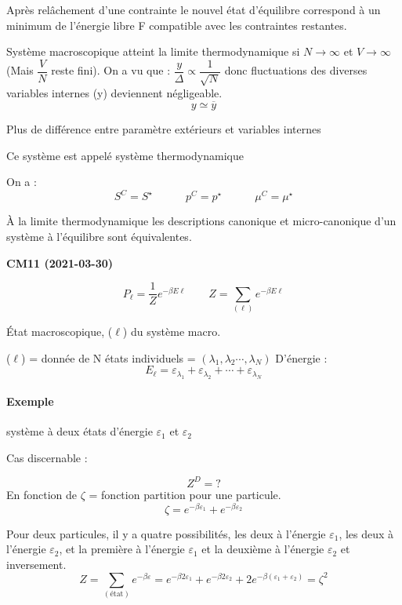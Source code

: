 \documentclass[12pt,a4paper]{report}
\begin{document}
Après relâchement d'une contrainte le nouvel état d'équilibre correspond à un minimum de l'énergie libre F compatible avec les contraintes restantes.

Système macroscopique atteint la limite thermodynamique si \( N \rightarrow \infty \) et \( V \rightarrow \infty \) (Mais \(\dfrac{V}{N}\) reste fini).
On a vu que : \( \dfrac{y}{ \Delta} \propto \dfrac{1}{\sqrt{N}} \) donc fluctuations des diverses variables internes (y) deviennent négligeable.
\[
	y \simeq \overline{y} 
\]

Plus de différence entre paramètre extérieurs et variables internes 

Ce système est appelé système thermodynamique

On a :
\[
	S^C = S^\star \quad \quad \quad p^C = p^\star \quad \quad \quad \mu^C = \mu^\star
\]

À la limite thermodynamique les descriptions canonique et micro-canonique d'un système à l'équilibre sont équivalentes.

\begin{center}
\textbf{CM11 (2021-03-30)}
\end{center}

\[
	P_\ell = \dfrac{1}{Z} e^{-\beta E \ell } \qquad Z = \sum_{(\ell)} e^{-\beta E \ell}
\]

État macroscopique, ($\ell$) du système macro.

($\ell$) = donnée de N états individuels = $(\lambda_1, \lambda_2 \cdots, \lambda_N)$
D'énergie :
\[
	E_\ell = \varepsilon_{\lambda_1} + \varepsilon_{\lambda_2}+ \cdots + \varepsilon_{\lambda_N}
\]

\paragraph{Exemple} système à deux états d'énergie $\varepsilon_1$ et $\varepsilon_2$

Cas discernable :

\[
	Z^D = ?
\]
En fonction de \( \zeta \) = fonction partition pour une particule.
\[
	\zeta = e^{-\beta \varepsilon_1} + e^{-\beta \varepsilon_2}
\]

Pour deux particules, il y a quatre possibilités, les deux à l'énergie $\varepsilon_1$, les deux à l'énergie $\varepsilon_2$, et la première à l'énergie $\varepsilon_1$ et la deuxième à l'énergie $\varepsilon_2$ et inversement.
\[
	Z = \sum_{(\text{état})} e^{-\beta \varepsilon} = e^{-\beta 2 \varepsilon_1}+e^{-\beta 2 \varepsilon_2} + 2 e^{-\beta (\varepsilon_1 + \varepsilon_2)}  = \zeta^2
\]
\end{document}
